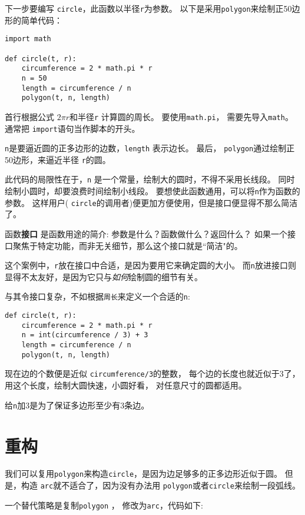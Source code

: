 \documentclass[10pt]{book}
\begin{document}
下一步要编写 {\tt circle}，此函数以半径{\tt r}为参数。
以下是采用{\tt polygon}来绘制正50边形的简单代码：

\begin{verbatim}
import math

def circle(t, r):
    circumference = 2 * math.pi * r
    n = 50
    length = circumference / n
    polygon(t, n, length)
\end{verbatim}
%
首行根据公式 $2 \pi r$和半径{\tt r} 计算圆的周长。
要使用{\tt math.pi}， 需要先导入{\tt math}。
通常把 {\tt import}语句当作脚本的开头。

{\tt n}是要逼近圆的正多边形的边数，{\tt length} 表示边长。
最后， {\tt polygon}通过绘制正50边形，来逼近半径 {\tt r}的圆。

此代码的局限性在于，{\tt n} 是一个常量，绘制大的圆时，不得不采用长线段。
同时绘制小圆时，却要浪费时间绘制小线段。
要想使此函数通用，可以将{\tt n}作为函数的参数。
这样用户( {\tt circle}的调用者)便更加方便使用，但是接口便显得不那么简洁了。

函数{\bf 接口} 是函数用途的简介: 参数是什么？函数做什么？返回什么？
如果一个接口聚焦于特定功能，而非无关细节，那么这个接口就是``简洁"的。

这个案例中，{\tt r}放在接口中合适，是因为要用它来确定圆的大小。
而{\tt n}放进接口则显得不太友好，是因为它只与{\em 如何}绘制圆的细节有关。

与其令接口复杂，不如根据{\tt 周长}来定义一个合适的{\tt n}:

\begin{verbatim}
def circle(t, r):
    circumference = 2 * math.pi * r
    n = int(circumference / 3) + 3
    length = circumference / n
    polygon(t, n, length)
\end{verbatim}
%
现在边的个数便是近似 {\tt circumference/3}的整数，
每个边的长度也就近似于3了，用这个长度，绘制大圆快速，小圆好看，
对任意尺寸的圆都适用。

给{\tt n}加3是为了保证多边形至少有3条边。

\section{重构}
\label{refactoring}

我们可以复用{\tt polygon}来构造{\tt circle}，是因为边足够多的正多边形近似于圆。
但是，构造 {\tt arc}就不适合了，因为没有办法用 {\tt polygon}或者{\tt circle}来绘制一段弧线。

一个替代策略是复制{\tt polygon} ， 修改为{\tt arc}，代码如下:
\end{document}
